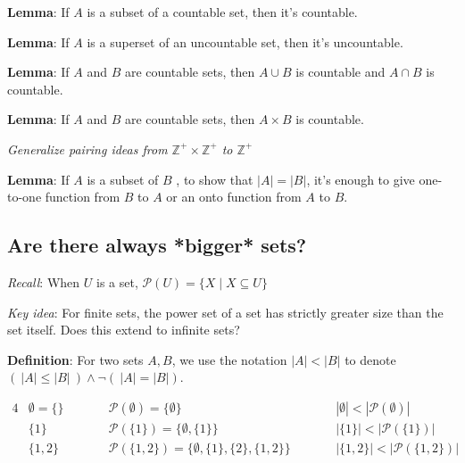 \documentclass[12pt, oneside]{article}
\begin{document}
{\bf Lemma}: If $A$ is a subset of a countable set, then it's countable.

\vspace{80pt}

{\bf Lemma}: If $A$ is a superset of an uncountable set, then it's uncountable.

\vspace{80pt}

{\bf Lemma}: If $A$ and $B$ are countable sets, then $A \cup B$ is countable
and $A \cap B$ is countable.

\vspace{80pt}

{\bf Lemma}: If $A$ and $B$ are countable sets, then $A \times B$ is countable.

{\it Generalize pairing ideas from $\mathbb{Z}^+ \times \mathbb{Z}^+$ to $\mathbb{Z}^+$}

\vspace{50pt}

{\bf Lemma}: If $A$ is a subset of $B$ , to show that $|A| = |B|$, 
it's enough to give one-to-one function from $B$ to $A$ or an onto function 
from $A$ to $B$.

\vspace{80pt}
 
\subsection*{Are there always *bigger* sets?}


{\it Recall}: When $U$ is a set, $\mathcal{P}(U) = \{ X \mid X \subseteq U\}$

{\it Key idea}: For finite sets, the power set of a set has strictly greater size than the set itself.
Does this extend to infinite sets?

{\bf Definition}: For two sets $A, B$, we use the notation $|A| < |B|$ to denote
$(~|A| \leq |B| ~) \land \lnot (~|A| = |B|)$.

\begin{alignat*}{4}
    &\emptyset = \{ \} \qquad &&\mathcal{P}(\emptyset) = \{ \emptyset \} \qquad &&|\emptyset| < |\mathcal{P}(\emptyset)| \\
    &\{1 \} \qquad &&\mathcal{P}(\{1\}) = \{ \emptyset, \{1\} \} \qquad &&|\{1\}| < |\mathcal{P}(\{1\})| \\
    &\{1,2 \} \qquad &&\mathcal{P}(\{1,2\}) = \{ \emptyset, \{1\}, \{2\}, \{1,2\} \} \qquad &&|\{1,2\}| < |\mathcal{P}(\{1,2\})| \\
\end{alignat*}
\end{document}
